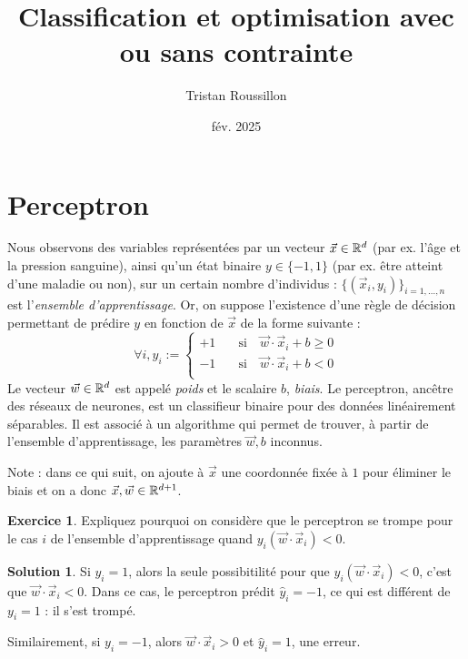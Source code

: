 \documentclass[a4paper,francais]{article}
\title{Classification et optimisation avec ou sans contrainte}
\author{Tristan Roussillon}
\date{fév. 2025}
\newcommand{\R}{{\ensuremath\mathbb{R}}}
\theoremstyle{definition}
\newtheorem{exercice}{Exercice}[section]
\newtheorem*{solution}{Solution}
\begin{document}
\maketitle

\section{Perceptron}
\label{sec:perceptron}

Nous observons des variables représentées par un vecteur $\vec{x} \in \R^d$
(par ex. l'âge et la pression sanguine), ainsi qu'un état binaire $y \in \{-1,1\}$
(par ex. être atteint d'une maladie ou non), sur un certain nombre d'individus :
$\{(\vec{x}_i,y_i)\}_{i = 1,\dots, n}$ est l'\emph{ensemble d'apprentissage}.
Or, on suppose l'existence d'une règle de décision permettant de prédire $y$
en fonction de $\vec{x}$ de la forme suivante :
\[
\forall i, \hat{y}_i :=
\left\{
\begin{array}{ll}
  +1 & \quad \mathrm{si}\quad \vec{w}\cdot\vec{x}_i + b \geq 0 \\
  -1 & \quad \mathrm{si}\quad \vec{w}\cdot\vec{x}_i + b < 0 \\
\end{array}
\right.
\]
Le vecteur $\vec{w} \in \R^d$ est appelé \emph{poids} et le scalaire $b$, \emph{biais}.
Le perceptron, ancêtre des réseaux de neurones, est un classifieur binaire pour des
données linéairement séparables. Il est associé à un algorithme qui permet de trouver,
à partir de l'ensemble d'apprentissage, les paramètres $\vec{w},b$ inconnus. 

Note : dans ce qui suit, on ajoute à $\vec{x}$ une coordonnée fixée à $1$ pour éliminer
le biais et on a donc $\vec{x}, \vec{w} \in \R^{d+1}$. 

\begin{exercice}
  Expliquez pourquoi on considère que le perceptron se trompe pour le cas $i$
  de l'ensemble d'apprentissage quand $y_i (\vec{w}\cdot\vec{x}_i) < 0$.
\end{exercice}

\begin{solution}
  Si $y_i = 1$, alors la seule possibitilité pour que
  $y_i (\vec{w}\cdot\vec{x}_i) < 0$, c'est que
  $\vec{w}\cdot\vec{x}_i < 0$. Dans ce cas, le perceptron prédit
  $\hat{y}_i = -1$, ce qui est différent de $y_i = 1$ : il s'est trompé.

  Similairement, si $y_i = -1$, alors $\vec{w}\cdot\vec{x}_i > 0$
  et $\hat{y}_i = 1$, une erreur. 
\end{solution}
\end{document}
